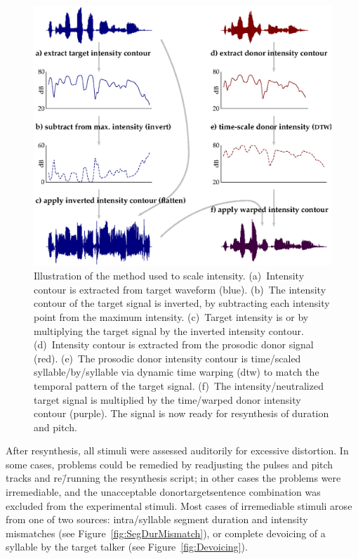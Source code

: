 \begin{figure}
	\begin{centering}
	\includegraphics{figures/intensity/intensity2.eps}
	\caption[Intensity scaling in resynthesis]{Illustration of the method used to scale intensity.  (a)~Intensity contour is extracted from target waveform (blue).  (b)~The intensity contour of the target signal is inverted, by subtracting each intensity point from the maximum intensity.  (c)~Target intensity is  or  by multiplying the target signal by the inverted intensity contour.  (d)~Intensity contour is extracted from the prosodic donor signal (red).  (e)~The prosodic donor intensity contour is time\-/scaled syllable\-/by\-/syllable via dynamic time warping (\ac{dtw}) to match the temporal pattern of the target signal.  (f)~The intensity\-/neutralized target signal is multiplied by the time\-/warped donor intensity contour (purple).  The signal is now ready for \psola{} resynthesis of duration and pitch.\label{fig:IntenManip}}
	\end{centering}
\end{figure}

After resynthesis, all stimuli were assessed auditorily for excessive distortion.  In some cases, problems could be remedied by readjusting the pulses and pitch tracks and re\=/running the resynthesis script; in other cases the problems were irremediable, and the unacceptable donor\slsh target\slsh sentence combination was excluded from the experimental stimuli.  Most cases of irremediable stimuli arose from one of two sources: intra\-/syllable segment duration and intensity mismatches (see Figure~\ref{fig:SegDurMismatch}), or complete devoicing of a syllable by the target talker (see Figure~\ref{fig:Devoicing}).

